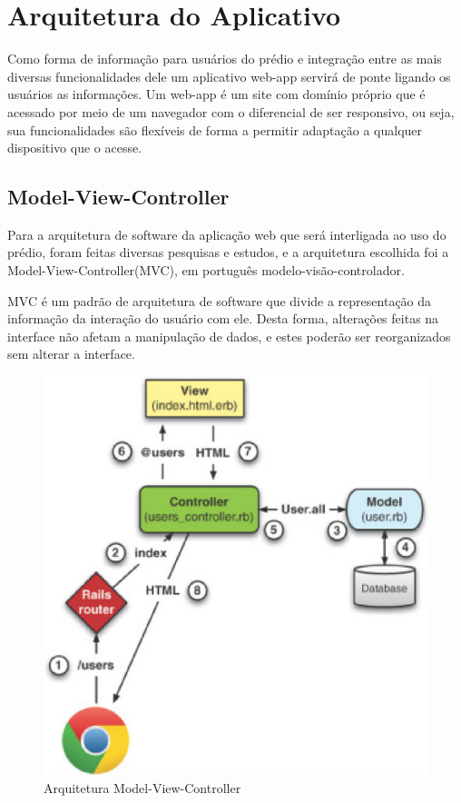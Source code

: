 \section{Arquitetura do Aplicativo}

Como forma de informação para usuários do prédio e integração entre as mais diversas funcionalidades dele um aplicativo web-app servirá de ponte ligando os usuários as informações.
Um web-app é um site com domínio próprio que é acessado por meio de um navegador com o diferencial de ser responsivo, ou seja, sua funcionalidades são flexíveis de forma a permitir adaptação a qualquer dispositivo que o acesse.

\subsection{Model-View-Controller}

Para a arquitetura de software da aplicação web que será interligada ao uso do prédio, foram feitas diversas pesquisas e estudos, e a arquitetura escolhida foi a Model-View-Controller(MVC), em português modelo-visão-controlador.

MVC é um padrão de arquitetura de software que divide a representação da informação da interação do usuário com ele. Desta forma, alterações feitas na interface não afetam a manipulação de dados, e estes poderão ser reorganizados sem alterar a interface.

\begin{figure}[!h]
  \centering
  \includegraphics[keepaspectratio=true,scale=0.45]{figuras/MVC.eps}
  \caption{Arquitetura Model-View-Controller}
  \label{fig:mvc}
\end{figure}


